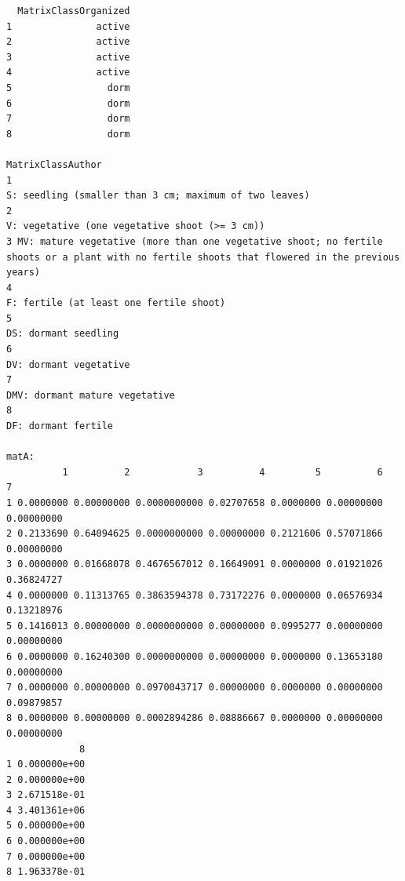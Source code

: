 \documentclass[
  12pt,
  letterpaper,
]{book}
\begin{document}
\begin{verbatim}
  MatrixClassOrganized
1               active
2               active
3               active
4               active
5                 dorm
6                 dorm
7                 dorm
8                 dorm
                                                                                                                                MatrixClassAuthor
1                                                                                          S: seedling (smaller than 3 cm; maximum of two leaves)
2                                                                                                  V: vegetative (one vegetative shoot (>= 3 cm))
3 MV: mature vegetative (more than one vegetative shoot; no fertile shoots or a plant with no fertile shoots that flowered in the previous years)
4                                                                                                         F: fertile (at least one fertile shoot)
5                                                                                                                            DS: dormant seedling
6                                                                                                                          DV: dormant vegetative
7                                                                                                                  DMV: dormant mature vegetative
8                                                                                                                             DF: dormant fertile

matA:
          1          2            3          4         5          6          7
1 0.0000000 0.00000000 0.0000000000 0.02707658 0.0000000 0.00000000 0.00000000
2 0.2133690 0.64094625 0.0000000000 0.00000000 0.2121606 0.57071866 0.00000000
3 0.0000000 0.01668078 0.4676567012 0.16649091 0.0000000 0.01921026 0.36824727
4 0.0000000 0.11313765 0.3863594378 0.73172276 0.0000000 0.06576934 0.13218976
5 0.1416013 0.00000000 0.0000000000 0.00000000 0.0995277 0.00000000 0.00000000
6 0.0000000 0.16240300 0.0000000000 0.00000000 0.0000000 0.13653180 0.00000000
7 0.0000000 0.00000000 0.0970043717 0.00000000 0.0000000 0.00000000 0.09879857
8 0.0000000 0.00000000 0.0002894286 0.08886667 0.0000000 0.00000000 0.00000000
             8
1 0.000000e+00
2 0.000000e+00
3 2.671518e-01
4 3.401361e+06
5 0.000000e+00
6 0.000000e+00
7 0.000000e+00
8 1.963378e-01


\end{verbatim}
\end{document}
